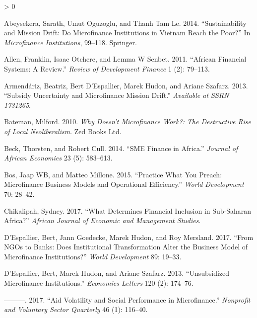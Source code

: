 \documentclass[
]{article}
\newlength{\cslhangindent}
\newenvironment{CSLReferences}[2] %
 {%
  \setlength{\parindent}{0pt}
  \ifodd #1 \everypar{\setlength{\hangindent}{\cslhangindent}}\ignorespaces\fi
  \ifnum #2 > 0
  \setlength{\parskip}{#2\baselineskip}
  \fi
 }%
 {}
\begin{document}
\hypertarget{refs}{}
\begin{CSLReferences}{1}{0}
\leavevmode\hypertarget{ref-abeysekera2014sustainability}{}%
Abeysekera, Sarath, Umut Oguzoglu, and Thanh Tam Le. 2014.
{``Sustainability and Mission Drift: Do Microfinance Institutions in
Vietnam Reach the Poor?''} In \emph{Microfinance Institutions}, 99--118.
Springer.

\leavevmode\hypertarget{ref-allen2011african}{}%
Allen, Franklin, Isaac Otchere, and Lemma W Senbet. 2011. {``African
Financial Systems: A Review.''} \emph{Review of Development Finance} 1
(2): 79--113.

\leavevmode\hypertarget{ref-armendariz2013subsidy}{}%
Armendáriz, Beatriz, Bert D'Espallier, Marek Hudon, and Ariane Szafarz.
2013. {``Subsidy Uncertainty and Microfinance Mission Drift.''}
\emph{Available at SSRN 1731265}.

\leavevmode\hypertarget{ref-bateman2010doesn}{}%
Bateman, Milford. 2010. \emph{Why Doesn't Microfinance Work?: The
Destructive Rise of Local Neoliberalism}. Zed Books Ltd.

\leavevmode\hypertarget{ref-beck2014sme}{}%
Beck, Thorsten, and Robert Cull. 2014. {``SME Finance in Africa.''}
\emph{Journal of African Economies} 23 (5): 583--613.

\leavevmode\hypertarget{ref-bos2015practice}{}%
Bos, Jaap WB, and Matteo Millone. 2015. {``Practice What You Preach:
Microfinance Business Models and Operational Efficiency.''} \emph{World
Development} 70: 28--42.

\leavevmode\hypertarget{ref-chikalipah2017determines}{}%
Chikalipah, Sydney. 2017. {``What Determines Financial Inclusion in
Sub-Saharan Africa?''} \emph{African Journal of Economic and Management
Studies}.

\leavevmode\hypertarget{ref-d2017ngos}{}%
D'Espallier, Bert, Jann Goedecke, Marek Hudon, and Roy Mersland. 2017.
{``From NGOs to Banks: Does Institutional Transformation Alter the
Business Model of Microfinance Institutions?''} \emph{World Development}
89: 19--33.

\leavevmode\hypertarget{ref-d2013unsubsidized}{}%
D'Espallier, Bert, Marek Hudon, and Ariane Szafarz. 2013.
{``Unsubsidized Microfinance Institutions.''} \emph{Economics Letters}
120 (2): 174--76.

\leavevmode\hypertarget{ref-d2017aid}{}%
---------. 2017. {``Aid Volatility and Social Performance in
Microfinance.''} \emph{Nonprofit and Voluntary Sector Quarterly} 46 (1):
116--40.


\end{CSLReferences}
\end{document}
